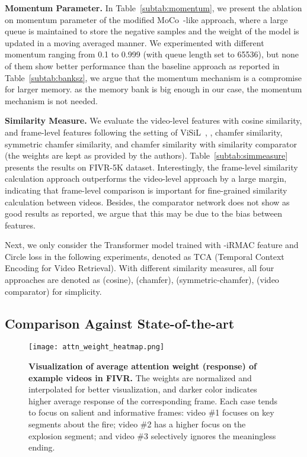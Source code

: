 \documentclass[10pt,twocolumn,letterpaper]{article}
\begin{document}
\textbf{Momentum Parameter.}
In Table~\ref{subtab:momentum}, we present the ablation on momentum parameter of the modified MoCo~\cite{he2019momentum}-like approach, where a large queue is maintained to store the negative samples and the weight of the model is updated in a moving averaged manner.
We experimented with different momentum ranging from 0.1 to 0.999 (with queue length set to 65536), but none of them show better performance than the baseline approach as reported in Table~\ref{subtab:banksz}, we argue that the momentum mechanism is a compromise for larger memory. as the memory bank is big enough in our case, the momentum mechanism is not needed. 

\textbf{Similarity Measure.}
We evaluate the video-level features with cosine similarity, and frame-level features following the setting of ViSiL~\cite{kordopatis2019visil}, \ie, chamfer similarity, symmetric chamfer similarity, and chamfer similarity with similarity comparator (the weights are kept as provided by the authors). Table~\ref{subtab:simmeasure} presents the results on FIVR-5K dataset. Interestingly, the frame-level similarity calculation approach outperforms the video-level approach by a large margin, indicating that frame-level comparison is important for fine-grained similarity calculation between videos. Besides, the comparator network does not show as good results as reported, we argue that this may be due to the bias between features.


Next, we only consider the Transformer model trained with -iRMAC feature and Circle loss in the following experiments, denoted as TCA (Temporal Context Encoding for Video Retrieval). With different similarity measures, all four approaches are denoted as  (cosine),  (chamfer),  (symmetric-chamfer),  (video comparator) for simplicity.

\subsection{Comparison Against State-of-the-art} \label{paragraph:compsota}
\begin{figure*}[t]
    \centering
    \texttt{[image: attn\_weight\_heatmap.png]}
    \caption{\textbf{Visualization of average attention weight (response) of example videos in FIVR.} The weights are normalized and interpolated for better visualization, and darker color indicates higher average response of the corresponding frame. Each case tends to focus on salient and informative frames: video \#1 focuses on key segments about the fire; video \#2 has a higher focus on the explosion segment; and video \#3 selectively ignores the meaningless ending.}
    \label{fig:attn}
\end{figure*}
\end{document}
